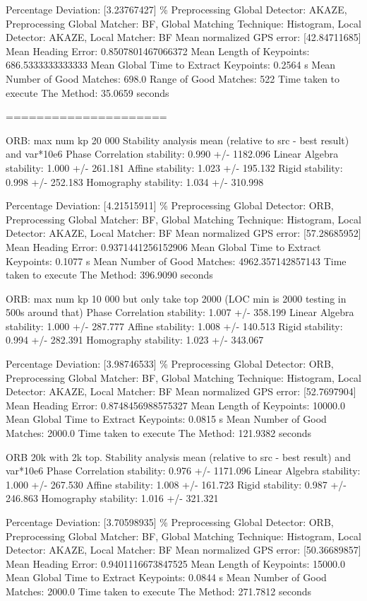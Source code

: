 Percentage Deviation: [3.23767427] \%
Preprocessing Global Detector: AKAZE, Preprocessing Global Matcher: BF, Global Matching Technique: Histogram, Local Detector: AKAZE, Local Matcher: BF
Mean normalized GPS error: [42.84711685]
 Mean Heading Error: 0.8507801467066372
Mean Length of Keypoints: 686.5333333333333
Mean Global Time to Extract Keypoints: 0.2564 s
Mean Number of Good Matches: 698.0
Range of Good Matches: 522
Time taken to execute The Method: 35.0659 seconds



=====================

ORB: max num kp 20 000
Stability analysis mean (relative to src - best result) and var*10e6
Phase Correlation stability: 0.990 +/- 1182.096
Linear Algebra stability: 1.000 +/- 261.181
Affine stability: 1.023 +/- 195.132
Rigid stability: 0.998 +/- 252.183
Homography stability: 1.034 +/- 310.998

Percentage Deviation: [4.21515911] \%
Preprocessing Global Detector: ORB, Preprocessing Global Matcher: BF, Global Matching Technique: Histogram, Local Detector: AKAZE, Local Matcher: BF
Mean normalized GPS error: [57.28685952]
 Mean Heading Error: 0.9371441256152906 
Mean Global Time to Extract Keypoints: 0.1077 s
Mean Number of Good Matches: 4962.357142857143
Time taken to execute The Method: 396.9090 seconds


ORB: max num kp 10 000 but only take top 2000 (LOC min is 2000 testing in 500s around that)
Phase Correlation stability: 1.007 +/- 358.199
Linear Algebra stability: 1.000 +/- 287.777
Affine stability: 1.008 +/- 140.513
Rigid stability: 0.994 +/- 282.391
Homography stability: 1.023 +/- 343.067

Percentage Deviation: [3.98746533] \%
Preprocessing Global Detector: ORB, Preprocessing Global Matcher: BF, Global Matching Technique: Histogram, Local Detector: AKAZE, Local Matcher: BF
Mean normalized GPS error: [52.7697904]
 Mean Heading Error: 0.8748456988575327
Mean Length of Keypoints: 10000.0
Mean Global Time to Extract Keypoints: 0.0815 s
Mean Number of Good Matches: 2000.0
Time taken to execute The Method: 121.9382 seconds


ORB 20k with 2k top. 
Stability analysis mean (relative to src - best result) and var*10e6
Phase Correlation stability: 0.976 +/- 1171.096
Linear Algebra stability: 1.000 +/- 267.530
Affine stability: 1.008 +/- 161.723
Rigid stability: 0.987 +/- 246.863
Homography stability: 1.016 +/- 321.321

Percentage Deviation: [3.70598935] \%
Preprocessing Global Detector: ORB, Preprocessing Global Matcher: BF, Global Matching Technique: Histogram, Local Detector: AKAZE, Local Matcher: BF
Mean normalized GPS error: [50.36689857]
 Mean Heading Error: 0.9401116673847525
Mean Length of Keypoints: 15000.0
Mean Global Time to Extract Keypoints: 0.0844 s
Mean Number of Good Matches: 2000.0
Time taken to execute The Method: 271.7812 seconds


